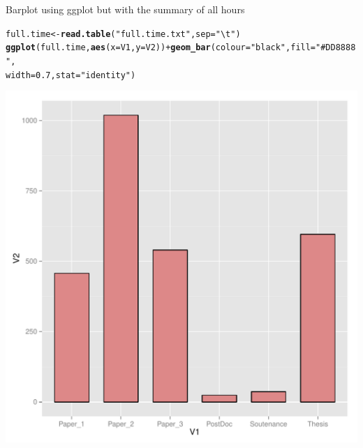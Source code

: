 \documentclass{report}\usepackage[]{graphicx}\usepackage[]{color}
\makeatletter
\def\maxwidth{ %
  \ifdim\Gin@nat@width>\linewidth
    \linewidth
  \else
    \Gin@nat@width
  \fi
}
\newcommand{\hlnum}[1]{\textcolor[rgb]{0.686,0.059,0.569}{#1}}%
\newcommand{\hlstr}[1]{\textcolor[rgb]{0.192,0.494,0.8}{#1}}%
\newcommand{\hlopt}[1]{\textcolor[rgb]{0,0,0}{#1}}%
\newcommand{\hlstd}[1]{\textcolor[rgb]{0.345,0.345,0.345}{#1}}%
\newcommand{\hlkwb}[1]{\textcolor[rgb]{0.69,0.353,0.396}{#1}}%
\newcommand{\hlkwc}[1]{\textcolor[rgb]{0.333,0.667,0.333}{#1}}%
\newcommand{\hlkwd}[1]{\textcolor[rgb]{0.737,0.353,0.396}{\textbf{#1}}}%
\newenvironment{kframe}{%
 \def\at@end@of@kframe{}%
 \ifinner\ifhmode%
  \def\at@end@of@kframe{\end{minipage}}%
  \begin{minipage}{\columnwidth}%
 \fi\fi%
 \def\FrameCommand##1{\hskip\@totalleftmargin \hskip-\fboxsep
 \colorbox{shadecolor}{##1}\hskip-\fboxsep
     \hskip-\linewidth \hskip-\@totalleftmargin \hskip\columnwidth}%
 \MakeFramed {\advance\hsize-\width
   \@totalleftmargin\z@ \linewidth\hsize
   \@setminipage}}%
 {\par\unskip\endMakeFramed%
 \at@end@of@kframe}
\newenvironment{knitrout}{}{} %
\makeatother
\begin{document}
Barplot using ggplot but with the summary of all hours
\begin{knitrout}
\color{fgcolor}\begin{kframe}
\begin{alltt}
\hlstd{full.time} \hlkwb{<-} \hlkwd{read.table}\hlstd{(}\hlstr{"full.time.txt"}\hlstd{,} \hlkwc{sep} \hlstd{=} \hlstr{"\textbackslash{}t"}\hlstd{)}
\hlkwd{ggplot}\hlstd{(full.time,} \hlkwd{aes}\hlstd{(}\hlkwc{x} \hlstd{= V1,} \hlkwc{y} \hlstd{= V2))} \hlopt{+} \hlkwd{geom_bar}\hlstd{(}\hlkwc{colour} \hlstd{=} \hlstr{"black"}\hlstd{,} \hlkwc{fill} \hlstd{=} \hlstr{"#DD8888"}\hlstd{,}
    \hlkwc{width} \hlstd{=} \hlnum{0.7}\hlstd{,} \hlkwc{stat} \hlstd{=} \hlstr{"identity"}\hlstd{)}
\end{alltt}
\end{kframe}
\includegraphics[width=\maxwidth]{figure/unnamed-chunk-8} 

\end{knitrout}
\end{document}
